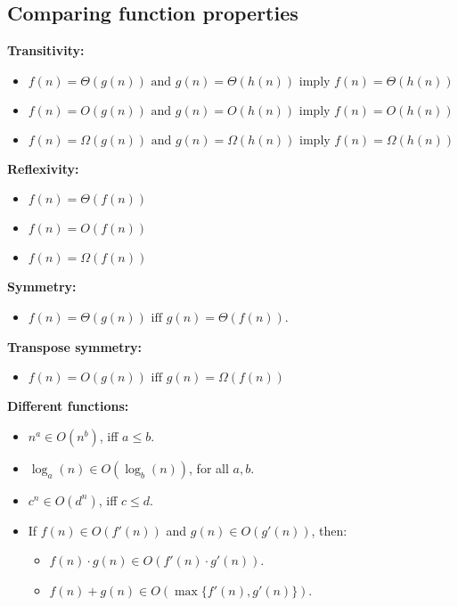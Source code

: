 \subsection{Comparing function properties}
    \begin{definition}
        
        \textbf{Transitivity:}
        \begin{itemize}
            \item $f(n) = \Theta(g(n)) \text{ and } g(n)=\Theta(h(n)) \text{ imply } f(n) = \Theta(h(n))$
            \item $f(n) = O(g(n)) \text{ and } g(n)=O(h(n)) \text{ imply } f(n) = O(h(n))$
            \item $f(n) = \Omega(g(n)) \text{ and } g(n)=\Omega(h(n)) \text{ imply } f(n) = \Omega(h(n))$
        \end{itemize}
        \vspace{1em}

        \textbf{Reflexivity:}
        \begin{itemize}
            \item $f(n) = \Theta(f(n))$
            \item $f(n) = O(f(n))$
            \item $f(n) = \Omega(f(n))$
        \end{itemize}
        \vspace{1em}

        \textbf{Symmetry:}
        \begin{itemize}
            \item $f(n) = \Theta(g(n)) \text{ iff } g(n) = \Theta(f(n))$.
        \end{itemize}
        \vspace{1em}

        \textbf{Transpose symmetry:}
        \begin{itemize}
            \item $f(n) = O(g(n)) \text{ iff } g(n) = \Omega(f(n))$
        \end{itemize}
        \vspace{1em}

        \textbf{Different functions:}
        \begin{itemize}
            \item \( n^a \in O(n^b) \), iff \( a \leq b \).
            \item \( \log_a(n) \in O(\log_b(n)) \), for all \( a, b \).
            \item \( c^n \in O(d^n) \), iff \( c \leq d \).
            \item If \( f(n) \in O(f'(n)) \) and \( g(n) \in O(g'(n)) \), then:
            \begin{itemize}
                \item \( f(n) \cdot g(n) \in O(f'(n) \cdot g'(n)) \).
                \item \( f(n) + g(n) \in O(\max\{f'(n), g'(n)\}) \).
            \end{itemize}
        \end{itemize}
        
    \end{definition}

